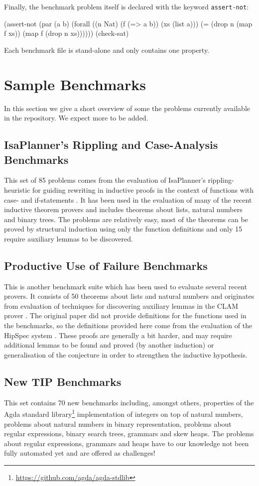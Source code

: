 \documentclass{llncs}
\begin{document}
Finally, the benchmark problem itself is declared with the keyword \texttt{assert-not}:

\begin{code}
(assert-not
  (par (a b)
    (forall ((n Nat) (f (=> a b)) (xs (list a)))
      (= (drop n (map f xs)) (map f (drop n xs))))))
(check-sat)
\end{code}
Each benchmark file is stand-alone and only contains one property.

\section{Sample Benchmarks}
In this section we give a short overview of  some the problems currently available in the repository. We expect more to be added.

\subsection{IsaPlanner's Rippling and Case-Analysis Benchmarks}
\label{sec:isap}
This set of 85 problems comes from the evaluation of IsaPlanner's rippling-heuristic for guiding rewriting in inductive proofs in the context of functions with case- and if-statements \cite{IsaPcase}. It has been used in the evaluation of many of the recent inductive theorem provers and includes theorems about lists, natural numbers and binary trees. The problems are relatively easy, most of the theorems can be proved by structural induction using only the function definitions and only 15 require auxiliary lemmas to be discovered.

\subsection{Productive Use of Failure Benchmarks}
This is another benchmark suite which has been used to evaluate several recent provers. It consists of 50 theorems about lists and natural numbers and originates from evaluation of techniques for discovering auxiliary lemmas in the CLAM prover \cite{productiveuse}. The original paper did not provide definitions for the functions used in the benchmarks, so the definitions provided here come from the evaluation of the HipSpec system \cite{hipspecCADE}. These proofs are generally a bit harder, and may require additional lemmas to be found and proved (by another induction) or generalisation of the conjecture in order to strengthen the inductive hypothesis.

\subsection{New TIP Benchmarks}
This set contains 70 new benchmarks including, amongst others,
properties of the Agda standard
library\footnote{\url{https://github.com/agda/agda-stdlib}}
implementation of integers on top of natural numbers, problems about natural numbers in binary representation, problems about regular expressions, binary search trees, grammars and skew heaps. The problems about regular expressions, grammars and heaps have to our knowledge not been fully automated yet and are offered as challenges!
\end{document}
